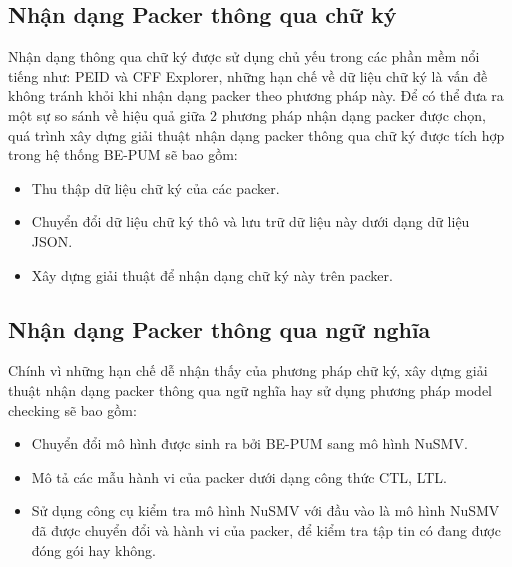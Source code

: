 \subsection {Nhận dạng Packer thông qua chữ ký}

\hspace{0.5cm}Nhận dạng thông qua chữ ký được sử dụng chủ yếu trong các phần mềm nổi tiếng như: PEID và CFF Explorer, những hạn chế về dữ liệu chữ ký là vấn đề không tránh khỏi khi nhận dạng packer theo phương pháp này. Để có thể đưa ra một sự so sánh về hiệu quả giữa 2 phương pháp nhận dạng packer được chọn, quá trình xây dựng giải thuật nhận dạng packer thông qua chữ ký được tích hợp trong hệ thống BE-PUM sẽ bao gồm:

\begin{itemize}
\item{Thu thập dữ liệu chữ ký của các packer.\\}
\item{Chuyển đổi dữ liệu chữ ký thô và lưu trữ dữ liệu này dưới dạng dữ liệu JSON.\\}
\item{Xây dựng giải thuật để nhận dạng chữ ký này trên packer.}
\end{itemize} 

\subsection {Nhận dạng Packer thông qua ngữ nghĩa}

\hspace{0.5cm}Chính vì những hạn chế dễ nhận thấy của phương pháp chữ ký, xây dựng giải thuật nhận dạng packer thông qua ngữ nghĩa hay sử dụng phương pháp model checking sẽ bao gồm:

\begin{itemize}
\item{Chuyển đổi mô hình được sinh ra bởi BE-PUM sang mô hình NuSMV.\\}
\item{Mô tả các mẫu hành vi của packer dưới dạng công thức CTL, LTL.\\}
\item{Sử dụng công cụ kiểm tra mô hình NuSMV với đầu vào là mô hình NuSMV đã được chuyển đổi và hành vi của packer, để kiểm tra tập tin có đang được đóng gói hay không.}
\end{itemize} 


